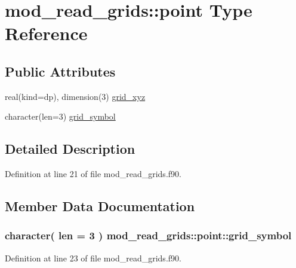 \hypertarget{structmod__read__grids_1_1point}{}\section{mod\+\_\+read\+\_\+grids\+:\+:point Type Reference}
\label{structmod__read__grids_1_1point}
\subsection*{Public Attributes}
\begin{DoxyCompactItemize}
\item 
real(kind=dp), dimension(3) \hyperlink{structmod__read__grids_1_1point_a44e07983c85907248f16a1d5409902a8}{grid\+\_\+xyz}
\item 
character(len=3) \hyperlink{structmod__read__grids_1_1point_a4eddf2d1dd9848de549cb9e5a54aa333}{grid\+\_\+symbol}
\end{DoxyCompactItemize}


\subsection{Detailed Description}


Definition at line 21 of file mod\+\_\+read\+\_\+grids.\+f90.



\subsection{Member Data Documentation}
\subsubsection[{\texorpdfstring{grid\+\_\+symbol}{grid_symbol}}]{\setlength{\rightskip}{0pt plus 5cm}character( len = 3 ) mod\+\_\+read\+\_\+grids\+::point\+::grid\+\_\+symbol}\hypertarget{structmod__read__grids_1_1point_a4eddf2d1dd9848de549cb9e5a54aa333}{}\label{structmod__read__grids_1_1point_a4eddf2d1dd9848de549cb9e5a54aa333}


Definition at line 23 of file mod\+\_\+read\+\_\+grids.\+f90.

